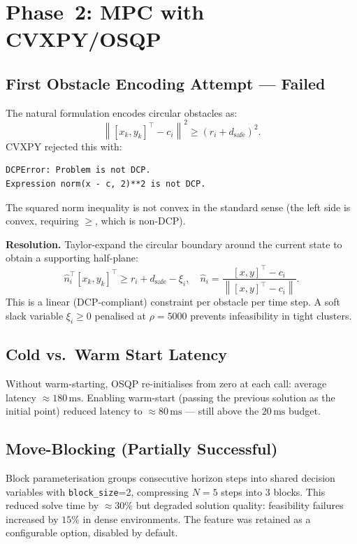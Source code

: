 \documentclass[12pt,a4paper,oneside]{report}
\newcommand{\norm}[1]{\left\lVert#1\right\rVert}
\begin{document}
\section{Phase~2: MPC with CVXPY/OSQP}

\subsection{First Obstacle Encoding Attempt --- Failed}

The natural formulation encodes circular obstacles as:
\[\norm{[x_k,y_k]^\top - c_i}^2 \geq (r_i+d_{\mathrm{safe}})^2.\]
CVXPY rejected this with:
\begin{verbatim}
DCPError: Problem is not DCP.
Expression norm(x - c, 2)**2 is not DCP.
\end{verbatim}
The squared norm inequality is not convex in the standard sense (the left
side is convex, requiring \(\geq\), which is non-DCP).

\textbf{Resolution.}  
Taylor-expand the circular boundary around the current state to obtain
a supporting half-plane:
\[\hat{n}_i^\top [x_k,y_k]^\top \geq r_i + d_{\mathrm{safe}} - \xi_i,\quad
  \hat{n}_i = \frac{[x,y]^\top - c_i}{\norm{[x,y]^\top-c_i}}.\]
This is a linear (DCP-compliant) constraint per obstacle per time step.
A soft slack variable \(\xi_i \geq 0\) penalised at \(\rho=5000\) prevents
infeasibility in tight clusters.

\subsection{Cold vs.\ Warm Start Latency}

Without warm-starting, OSQP re-initialises from zero at each call:
average latency \(\approx 180\,\text{ms}\). Enabling warm-start (passing
the previous solution as the initial point) reduced latency to
\(\approx 80\,\text{ms}\) --- still above the \(20\,\text{ms}\) budget.

\subsection{Move-Blocking (Partially Successful)}

Block parameterisation groups consecutive horizon steps into shared decision
variables with \texttt{block\_size}=2, compressing \(N=5\) steps into 3
blocks. This reduced solve time by \(\approx 30\%\) but degraded solution
quality: feasibility failures increased by \(15\%\) in dense environments.
The feature was retained as a configurable option, disabled by default.
\end{document}
